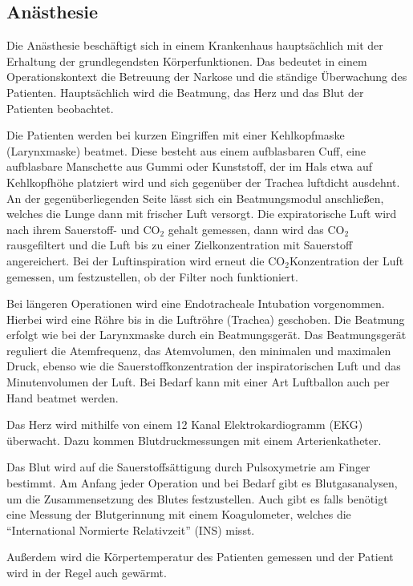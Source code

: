 \documentclass[11pt,a4paper,titlepage]{scrartcl}
\begin{document}
\subsection{Anästhesie}

Die Anästhesie beschäftigt sich in einem Krankenhaus hauptsächlich mit der Erhaltung der grundlegendsten Körperfunktionen.
Das bedeutet in einem Operationskontext die Betreuung der Narkose und die ständige Überwachung des Patienten.
Hauptsächlich wird die Beatmung, das Herz und das Blut der Patienten beobachtet. \medskip

Die Patienten werden bei kurzen Eingriffen mit einer Kehlkopfmaske (Larynxmaske) beatmet.
Diese besteht aus einem aufblasbaren Cuff, eine aufblasbare Manschette aus Gummi oder Kunststoff, der im Hals etwa auf Kehlkopfhöhe platziert wird und sich gegenüber der Trachea luftdicht ausdehnt.
An der gegenüberliegenden Seite lässt sich ein Beatmungsmodul anschließen, welches die Lunge dann mit frischer Luft versorgt.
Die expiratorische Luft wird nach ihrem Sauerstoff- und CO$_{2}$ gehalt gemessen, dann wird das CO$_{2}$ rausgefiltert und die Luft bis zu einer Zielkonzentration mit Sauerstoff angereichert.
Bei der Luftinspiration wird erneut die CO$_{2}$Konzentration der Luft gemessen, um festzustellen, ob der Filter noch funktioniert. \medskip

Bei längeren Operationen wird eine Endotracheale Intubation vorgenommen.
Hierbei wird eine Röhre bis in die Luftröhre (Trachea) geschoben.
Die Beatmung erfolgt wie bei der Larynxmaske durch ein Beatmungsgerät.
Das Beatmungsgerät reguliert die Atemfrequenz, das Atemvolumen, den minimalen und maximalen Druck, ebenso wie die Sauerstoffkonzentration der inspiratorischen Luft und das Minutenvolumen der Luft.
Bei Bedarf kann mit einer Art Luftballon auch per Hand beatmet werden. \medskip

Das Herz wird mithilfe von einem 12 Kanal Elektrokardiogramm (EKG) überwacht.
Dazu kommen Blutdruckmessungen mit einem Arterienkatheter. \medskip

Das Blut wird auf die Sauerstoffsättigung durch Pulsoxymetrie am Finger bestimmt.
Am Anfang jeder Operation und bei Bedarf gibt es Blutgasanalysen, um die Zusammensetzung des Blutes festzustellen.
Auch gibt es falls benötigt eine Messung der Blutgerinnung mit einem Koagulometer, welches die \enquote{International Normierte Relativzeit} (INS) misst.\medskip

Außerdem wird die Körpertemperatur des Patienten gemessen und der Patient wird in der Regel auch gewärmt. \medskip
\end{document}
